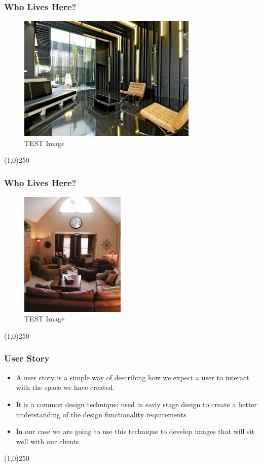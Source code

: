\begin{frame}
\frametitle{Who Lives Here?}
\begin{figure}
	\centering
		\includegraphics[height=6cm]{img/J.jpg}
	\caption{TEST Image}
	\label{fig:lightingtypes}
\end{figure}
\end{frame}
\begin{center}\line(1,0){250}\end{center}



\begin{frame}
\frametitle{Who Lives Here?}
\begin{figure}
	\centering
		\includegraphics[height=6cm]{img/K.jpg}
	\caption{TEST Image}
	\label{fig:lightingtypes}
\end{figure}
\end{frame}
\begin{center}\line(1,0){250}\end{center}



\begin{frame}
\frametitle{User Story}
\begin{itemize}
	\item A user story is a simple way of describing how we expect a user to interact with the space we have created.
	\item It is a common design technique; used in early stage design to create a better understanding of the design functionality requirements
	\item In our case we are going to use this technique to develop images that will sit well with our clients
\end{itemize}
\end{frame}
\begin{center}\line(1,0){250}\end{center}



